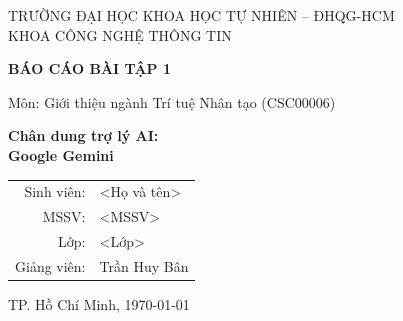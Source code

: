 \documentclass[12pt,a4paper]{article}
\begin{document}
\begin{titlepage}
  \centering
  {\large TRƯỜNG ĐẠI HỌC KHOA HỌC TỰ NHIÊN -- ĐHQG-HCM\\
   KHOA CÔNG NGHỆ THÔNG TIN\par}
  \vspace{3.5cm}
  {\Large\bfseries BÁO CÁO BÀI TẬP 1\par}
  \vspace{0.3cm}
  {\large Môn: Giới thiệu ngành Trí tuệ Nhân tạo (CSC00006)\par}
  \vspace{1.2cm}
  {\huge\bfseries Chân dung trợ lý AI:\\ Google Gemini\par}
  \vfill
  \begin{tabular}{rl}
    Sinh viên: & <Họ và tên> \\
    MSSV:      & <MSSV> \\
    Lớp:       & <Lớp> \\
    Giảng viên:& Trần Huy Bân \\
  \end{tabular}
  \par\vspace{1.5cm}
  TP. Hồ Chí Minh, \today
\end{titlepage}

\begin{abstract}
Bài viết này tìm hiểu về công cụ Gemini của Google thông qua các thông tin cơ bản như nguồn gốc, cách hoạt động, tính năng và các gói sử dụng. Đồng thời, bài viết cũng đưa ra những trải nghiệm thực tế của bản thân mình qua các ví dụ làm tốt và trả lời sai, từ đó phân tích những hạn chế về hiện tượng ảo giác và quyền riêng tư dữ liệu. Bên cạnh đó, bài báo cáo đối chiếu với các quy định hiện hành về liêm chính học thuật khi dùng AI trong giáo dục. Cuối cùng, mình đúc kết lại các kỹ năng cần thiết và đưa ra định hướng về cách sử dụng AI có trách nhiệm trong suốt 4 năm đại học.
\end{abstract}

\tableofcontents
\newpage

\end{document}
